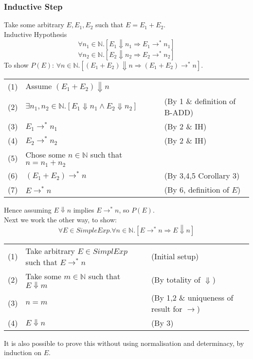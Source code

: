 \documentclass{report}
\begin{document}
\subsubsection*{Inductive Step}
Take some arbitrary $E, E_1, E_2$ such that $E = E_1 + E_2$.
\\ Inductive Hypothesis
\[\forall n_1 \in \mathbb{N} . [E_1 \Downarrow n_1 \Rightarrow E_1 \to^* n_1]\]
\[\forall n_2 \in \mathbb{N} . [E_2 \Downarrow n_2 \Rightarrow E_2 \to^* n_2]\]
To show $P(E)$: $\forall n \in \mathbb{N} . [(E_1 + E_2) \Downarrow n \Rightarrow (E_1 + E_2) \to^* n]$.
\begin{center}
	\begin{tabular}{l l l}
		(1) & Assume $(E_1 + E_2) \Downarrow n$                                                 &                               \\
		(2) & $\exists n_1, n_2 \in \mathbb{N} . [E_1 \Downarrow n_1 \land E_2 \Downarrow n_2]$ & (By 1 \& definition of B-ADD) \\
		(3) & $E_1 \to^* n_1$                                                                   & (By 2 \& IH)                  \\
		(4) & $E_2 \to^* n_2$                                                                   & (By 2 \& IH)                  \\
		(5) & Chose some $n \in \mathbb{N}$ such that $n = n_1 + n_2$                           &                               \\
		(6) & $(E_1 + E_2) \to^* n$                                                             & (By 3,4,5 Corollary 3)        \\
		(7) & $E \to^* n$                                                                       & (By 6, definition of $E$)     \\
	\end{tabular}
\end{center}
Hence assuming $E \Downarrow n$ implies $E \to^* n$, so $P(E)$.
\\
Next we work the other way, to show:
\[\forall E \in SimpleExp . \forall n \in \mathbb{N}.[E \to^* n \Rightarrow E \Downarrow n ]\]
\begin{center}
	\begin{tabular}{l l l}
		(1) & Take arbitrary $E \in SimplExp$ such that $E \to^* n$   & (Initial setup)                            \\
		(2) & Take some $m \in \mathbb{N}$ such that $E \Downarrow m$ & (By totality of $\Downarrow$)              \\
		(3) & $n = m$                                                 & (By 1,2 \& uniqueness of result for $\to$) \\
		(4) & $E \Downarrow n$                                        & (By 3)                                     \\
	\end{tabular}
\end{center}
It is also possible to prove this without using normalisation and determinacy, by induction on $E$.
\end{document}
